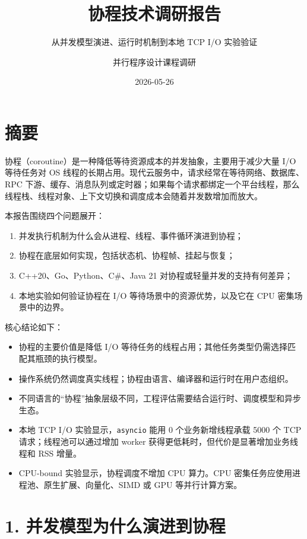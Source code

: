 \documentclass[
  11pt,
  a4paper,
]{article}
\title{协程技术调研报告}
\subtitle{从并发模型演进、运行时机制到本地 TCP I/O 实验验证}
\author{并行程序设计课程调研}
\date{2026-05-26}
\providecommand{\tightlist}{%
  \setlength{\itemsep}{0pt}\setlength{\parskip}{0pt}}
\begin{document}
\maketitle

\section{摘要}\label{ux6458ux8981}

协程（coroutine）是一种降低等待资源成本的并发抽象，主要用于减少大量 I/O
等待任务对 OS
线程的长期占用。现代云服务中，请求经常在等待网络、数据库、RPC
下游、缓存、消息队列或定时器；如果每个请求都绑定一个平台线程，那么线程栈、线程对象、上下文切换和调度成本会随着并发数增加而放大。

本报告围绕四个问题展开：

\begin{enumerate}
\def\labelenumi{\arabic{enumi}.}
\tightlist
\item
  并发执行机制为什么会从进程、线程、事件循环演进到协程；
\item
  协程在底层如何实现，包括状态机、协程帧、挂起与恢复；
\item
  C++20、Go、Python、C\#、Java 21 对协程或轻量并发的支持有何差异；
\item
  本地实验如何验证协程在 I/O 等待场景中的资源优势，以及它在 CPU
  密集场景中的边界。
\end{enumerate}

核心结论如下：

\begin{itemize}
\tightlist
\item
  协程的主要价值是降低 I/O
  等待任务的线程占用；其他任务类型仍需选择匹配其瓶颈的执行模型。
\item
  操作系统仍然调度真实线程；协程由语言、编译器和运行时在用户态组织。
\item
  不同语言的``协程''抽象层级不同，工程评估需要结合运行时、调度模型和异步生态。
\item
  本地 TCP I/O 实验显示，\texttt{asyncio} 能用 0 个业务新增线程承载 5000
  个 TCP 请求；线程池可以通过增加 worker
  获得更低耗时，但代价是显著增加业务线程和 RSS 增量。
\item
  CPU-bound 实验显示，协程调度不增加 CPU 算力。CPU
  密集任务应使用进程池、原生扩展、向量化、SIMD 或 GPU 等并行计算方案。
\end{itemize}

\section{1.
并发模型为什么演进到协程}\label{ux5e76ux53d1ux6a21ux578bux4e3aux4ec0ux4e48ux6f14ux8fdbux5230ux534fux7a0b}
\end{document}
